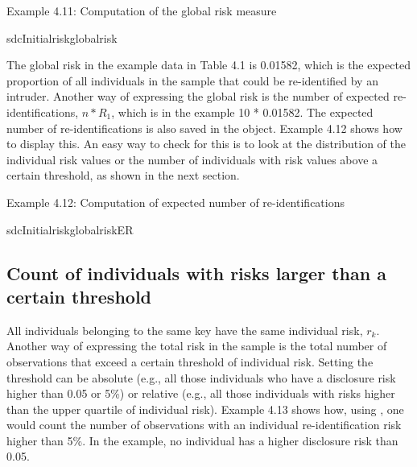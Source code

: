 \documentclass[letterpaper,10pt,english]{sphinxmanual}
\begin{document}
Example 4.11: Computation of the global risk measure

%
\begin{sphinxVerbatim}[commandchars=\\\{\}]
sdcInitialriskglobalrisk

\PYG{p}{[}\PYG{p}{]} 
\end{sphinxVerbatim}

The global risk in the example data in Table 4.1 is 0.01582, which is
the expected proportion of all individuals in the sample that could be
re-identified by an intruder. Another way of expressing the global risk
is the number of expected re-identifications, \(n*R_{1}\), which is
in the example 10 * 0.01582. The expected number of re-identifications
is also saved in the  object. Example 4.12 shows how to
display this.  An easy way
to check for this is to look at the distribution of the individual risk
values or the number of individuals with risk values above a certain
threshold, as shown in the next section.

Example 4.12: Computation of expected number of re-identifications

%
\begin{sphinxVerbatim}[commandchars=\\\{\}]
sdcInitialriskglobalrisk\PYGZus{}ER

    \PYG{p}{[}\PYG{p}{]} 
\end{sphinxVerbatim}


\subsection{Count of individuals with risks larger than a certain threshold}
\label{\detokenize{measure_risk:count-of-individuals-with-risks-larger-than-a-certain-threshold}}
All individuals belonging to the same key have the same individual risk,
\(r_{k}\). Another way of expressing the total risk in the sample is
the total number of observations that exceed a certain threshold of
individual risk. Setting the threshold can be absolute (e.g., all those
individuals who have a disclosure risk higher than 0.05 or 5\%) or
relative (e.g., all those individuals with risks higher than the upper
quartile of individual risk). Example 4.13 shows how, using , one
would count the number of observations with an individual
re-identification risk higher than 5\%. In the example, no individual has
a higher disclosure risk than 0.05.
\end{document}
